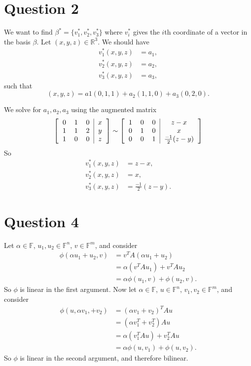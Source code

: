 \documentclass[12pt]{article}
\newcommand{\R}{\mathbb{R}}
\newcommand{\F}{\mathbb{F}}
\newcommand{\generic}[2]{\section*{#1}\begin{center}\framebox{\begin{minipage}{\textwidth-10pt}#2\end{minipage}}\end{center}}
\newcommand{\ques}[2]{\generic{Question #1}{#2}}
\begin{document}
\ques{2}{}

We want to find $\beta^*=\{v_1^*, v_2^*, v_3^*\}$ where $v_i^*$ gives the $i$th coordinate of a vector in the basis $\beta$. Let $(x,y,z)\in\R^3$. We should have
\begin{align*}
    v_1^*(x,y,z) &= a_1, \\
    v_2^*(x,y,z) &= a_2, \\
    v_3^*(x,y,z) &= a_3,
\end{align*}
such that
\[(x,y,z) = a1(0,1,1) + a_2(1,1,0) + a_3(0,2,0).\]

We solve for $a_1,a_2,a_3$ using the augmented matrix
\[\left[\begin{tabular}{ccc|c}
    0 & 1 & 0 & $x$ \\
    1 & 1 & 2 & $y$ \\
    1 & 0 & 0 & $z$ 
\end{tabular}\right]
\sim
\left[\begin{tabular}{ccc|c}
    1 & 0 & 0 & $z-x$ \\
    0 & 1 & 0 & $x$ \\
    0 & 0 & 1 & $\frac{-1}2(z-y)$ 
\end{tabular}\right]
\]
So
\begin{align*}
    v_1^*(x,y,z) &= z-x, \\
    v_2^*(x,y,z) &= x, \\
    v_3^*(x,y,z) &= \frac{-1}2(z-y).
\end{align*}


\ques{4}{}

Let $\alpha\in\F$, $u_1,u_2\in\F^n$, $v\in\F^m$, and consider
\begin{align*}
    \phi(\alpha u_1 + u_2, v)   &= v^TA(\alpha u_1 + u_2) \\
                                &= \alpha(v^TA u_1) + v^TAu_2 \\
                                &= \alpha\phi(u_1,v) + \phi(u_2,v).
\end{align*}
So $\phi$ is linear in the first argument. Now let $\alpha\in\F$, $u\in\F^n$, $v_1,v_2\in\F^m$, and consider
\begin{align*}
    \phi(u, \alpha v_1, +v_2)   &= (\alpha v_1 + v_2)^TAu \\
                                &= (\alpha v_1^T + v_2^T)Au \\
                                &= \alpha(v_1^TAu) + v_2^TAu \\
                                &= \alpha\phi(u,v_1) + \phi(u,v_2).
\end{align*}
So $\phi$ is linear in the second argument, and therefore bilinear.
\end{document}
